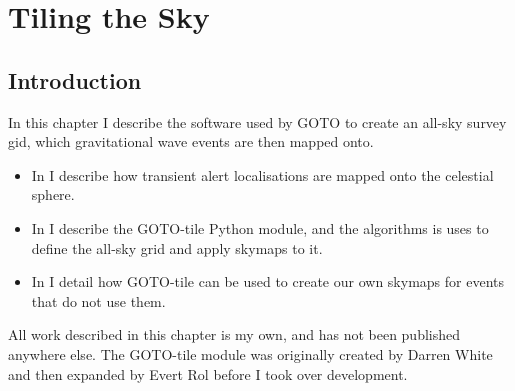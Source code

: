 \chapter{Tiling the Sky}
\label{chap:tiling}
\chaptoc{}


\newpage
\section{Introduction}
\label{sec:tiling_intro}
\begin{colsection}

In this chapter I describe the software used by GOTO to create an all-sky survey gid, which gravitational wave events are then mapped onto.
%
\begin{itemize}
    \item In  I describe how transient alert localisations are mapped onto the celestial sphere.
    \item In  I describe the GOTO-tile Python module, and the algorithms is uses to define the all-sky grid and apply skymaps to it.
    \item In  I detail how GOTO-tile can be used to create our own skymaps for events that do not use them.
\end{itemize}
%
All work described in this chapter is my own, and has not been published anywhere else. The GOTO-tile module was originally created by Darren White and then expanded by Evert Rol before I took over development.

\end{colsection}


\newpage
